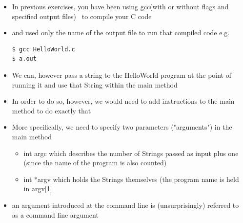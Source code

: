 \documentclass{beamer}
\begin{document}
\begin{frame}[fragile]
\begin{itemize}

\item In previous exercises, you have been using gcc(with or without flags and specified output files) \ to compile your C code 
\item and used only the name of the output file to run that compiled code e.g.


\begin{block}{}
\begin{lstlisting}
$ gcc HelloWorld.c
$ a.out

\end{lstlisting}
\end{block}

\end{itemize}
\end{frame}

\begin{frame}
\begin{itemize}


\item We can, however pass a string to the HelloWorld program at the point of running it and use that String within the
main method
\item In order to do so, however, we would need to add instructions to the main method to do exactly that

\end{itemize}
\end{frame}

\begin{frame}
\begin{itemize}

\item More specifically, we need to specify two parameters ("arguments") in the main method

\begin{itemize}
\item int argc which describes the number of Strings passed as input plus one (since the name of the program is also
counted)
\item int *argv which holds the Strings themselves (the program name is held in argv[1]
\end{itemize}
\item an argument introduced at the command line is (unsurprisingly) referred to as a command line argument

\end{itemize}
\end{frame}
\end{document}
